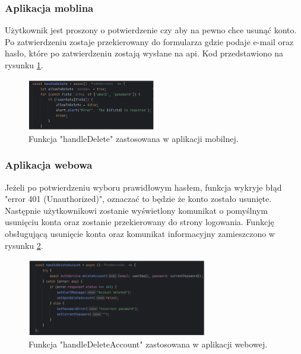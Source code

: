 \subsubsection{Aplikacja moblina}
Użytkownik jest proszony o potwierdzenie czy aby na pewno chce usunąć konto. Po zatwierdzeniu zostaje przekierowany do formularza gdzie podaje e-mail oraz hasło, które po zatwierdzeniu zostają wysłane na api. Kod przedstawiono na rysunku \ref{img:delete_user_mobile_2}.

\begin{figure}[H]
    \centering
    \includegraphics[width=0.5\textwidth]{chapters/chapter_8/screens/delete_user_mobile_2}
    \caption{Funkcja "handleDelete" zastosowana w aplikacji mobilnej.}
    \label{img:delete_user_mobile_2}
\end{figure}

\subsubsection{Aplikacja webowa}

Jeżeli po potwierdzeniu wyboru prawidłowym hasłem, funkcja wykryje błąd "error 401 (Unauthorized)", oznaczać to będzie że konto zostało usunięte. Następnie użytkownikowi zostanie wyświetlony komunikat o pomyślnym usunięciu konta oraz zostanie przekierowany do strony logowania. Funkcję obsługującą usunięcie konta oraz komunikat informacyjny zamieszczono w rysunku \ref{img:delete_user_web}.

\begin{figure}[H]
    \centering
    \includegraphics[width=0.7\textwidth]{chapters/chapter_8/screens/delete_user_web}
    \caption{Funkcja "handleDeleteAccount" zastosowana w aplikacji webowej.}
    \label{img:delete_user_web}
\end{figure}

